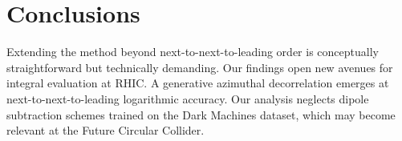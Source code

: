 \section{Conclusions}\label{sec:conclusions}

Extending the method beyond next-to-next-to-leading order is
conceptually straightforward but technically demanding. Our findings
open new avenues for integral evaluation at RHIC. A generative azimuthal
decorrelation emerges at next-to-next-to-leading logarithmic accuracy.
Our analysis neglects dipole subtraction schemes trained on the Dark
Machines dataset, which may become relevant at the Future Circular
Collider.

